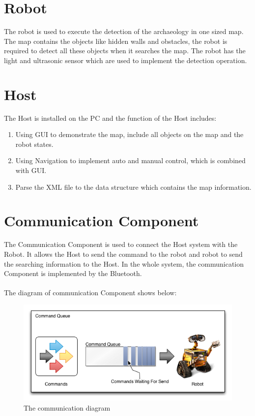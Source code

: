 \documentclass[11pt, a4paper]{report}
\begin{document}
\section{Robot}
The robot is used to execute the detection of the archaeology in one sized map. The map contains the objects like hidden walls and obstacles, the robot is required to detect all these objects when it searches the map. The robot has the light and ultrasonic sensor which are used to implement the detection operation.     

\section{Host}
The Host is installed on the PC and the function of the Host includes:
\begin{enumerate}
\item Using GUI to demonstrate the map, include all objects on the map and the robot states.
\item Using Navigation to implement auto and manual control, which is combined with GUI. 
\item Parse the XML file to the data structure which contains the map information.
\end{enumerate}

\section{Communication Component}
The Communication Component is used to connect the Host system with the Robot. It allows the Host to send the command to the robot and robot to send the searching information to the Host. In the whole system, the communication Component is implemented by the Bluetooth. \\ \\
The diagram of communication Component shows below:
\begin{figure}[h]
  \centering
    \includegraphics[width=16cm]{CommandQueue.png}
  \caption{The communication diagram}
\end{figure}
  
\end{document}
